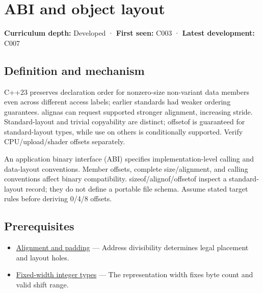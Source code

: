 \hypertarget{appendix-c4ac6bb0fff8}{}\label{referencestart:appendix-c4ac6bb0fff8}
\section{ABI and object layout}\label{appendix-c4ac6bb0fff8-abi-and-object-layout}

\textbf{Curriculum depth:} Developed · \textbf{First seen:} C003 · \textbf{Latest development:} C007

\begin{allmightroledefinition}

\subsection{Definition and mechanism}\label{appendix-c4ac6bb0fff8-definition-and-mechanism}

C++23 preserves declaration order for nonzero-size non-variant data members even across different access labels; earlier standards had weaker ordering guarantees. alignas can request supported stronger alignment, increasing stride. Standard-layout and trivial copyability are distinct; offsetof is guaranteed for standard-layout types, while use on others is conditionally supported. Verify CPU/upload/shader offsets separately.

\end{allmightroledefinition}

An application binary interface (ABI) specifies implementation-level calling and data-layout conventions. Member offsets, complete size/alignment, and calling conventions affect binary compatibility. sizeof/alignof/offsetof inspect a standard-layout record; they do not define a portable file schema. Assume stated target rules before deriving 0/4/8 offsets.

\subsection{Prerequisites}\label{appendix-c4ac6bb0fff8-prerequisites}

\begin{itemize}
\tightlist
\item
  \hyperref[appendix-a1f7c53b4742]{Alignment and padding} --- Address divisibility determines legal placement and layout holes.
\item
  \hyperref[appendix-cc04044b5782]{Fixed-width integer types} --- The representation width fixes byte count and valid shift range.
\end{itemize}

